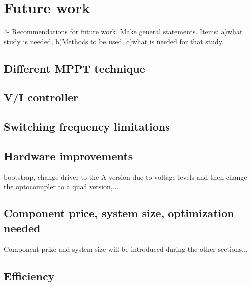 \section{Future work}
4- Recommendations for future work. Make general statements. Items: a)what study is needed, b)Methods to be used, c)what is needed for that study.

\subsection{Different MPPT technique}

\subsection{V/I controller}

\subsection{Switching frequency limitations}

\subsection{Hardware improvements}
bootstrap, change driver to the A version due to voltage levels and then change the optocouupler to a quad version,...

\subsection{Component price, system size, optimization needed}
Component prize and system size will be introduced during the other sections...

\subsection{Efficiency}
